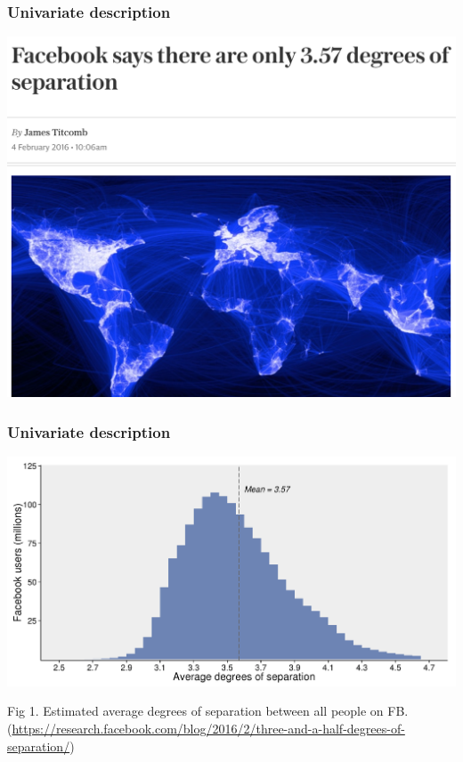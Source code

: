 \documentclass[aspectratio=43]{beamer}
\begin{document}
\begin{frame}
\frametitle{Univariate description}
\centering

\includegraphics[width = \textwidth]{../img/sixdegrees}

\end{frame}

\begin{frame}
\frametitle{Univariate description}
\centering

\includegraphics[width = \textwidth]{../img/facebook_separation}

{\footnotesize Fig 1. Estimated average degrees of separation between all people on FB.}
{\tiny (\url{https://research.facebook.com/blog/2016/2/three-and-a-half-degrees-of-separation/})}

\end{frame}
\end{document}
